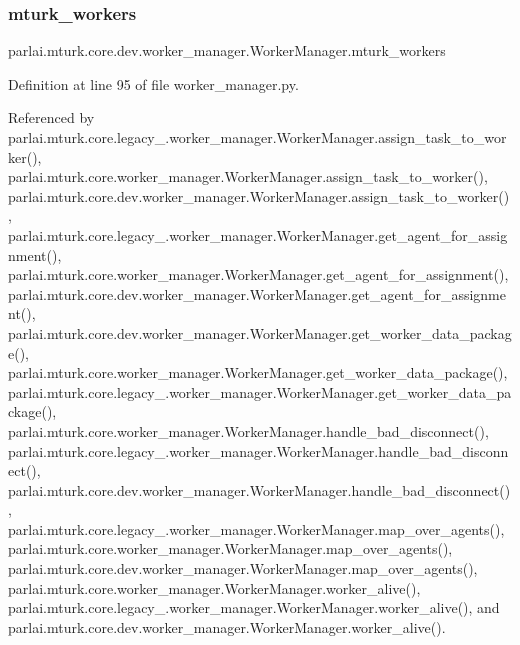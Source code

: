 \subsubsection{\texorpdfstring{mturk\+\_\+workers}{mturk\_workers}}
{\footnotesize\ttfamily parlai.\+mturk.\+core.\+dev.\+worker\+\_\+manager.\+Worker\+Manager.\+mturk\+\_\+workers}



Definition at line 95 of file worker\+\_\+manager.\+py.



Referenced by parlai.\+mturk.\+core.\+legacy\+\_.\+worker\+\_\+manager.\+Worker\+Manager.\+assign\+\_\+task\+\_\+to\+\_\+worker(), parlai.\+mturk.\+core.\+worker\+\_\+manager.\+Worker\+Manager.\+assign\+\_\+task\+\_\+to\+\_\+worker(), parlai.\+mturk.\+core.\+dev.\+worker\+\_\+manager.\+Worker\+Manager.\+assign\+\_\+task\+\_\+to\+\_\+worker(), parlai.\+mturk.\+core.\+legacy\+\_.\+worker\+\_\+manager.\+Worker\+Manager.\+get\+\_\+agent\+\_\+for\+\_\+assignment(), parlai.\+mturk.\+core.\+worker\+\_\+manager.\+Worker\+Manager.\+get\+\_\+agent\+\_\+for\+\_\+assignment(), parlai.\+mturk.\+core.\+dev.\+worker\+\_\+manager.\+Worker\+Manager.\+get\+\_\+agent\+\_\+for\+\_\+assignment(), parlai.\+mturk.\+core.\+dev.\+worker\+\_\+manager.\+Worker\+Manager.\+get\+\_\+worker\+\_\+data\+\_\+package(), parlai.\+mturk.\+core.\+worker\+\_\+manager.\+Worker\+Manager.\+get\+\_\+worker\+\_\+data\+\_\+package(), parlai.\+mturk.\+core.\+legacy\+\_.\+worker\+\_\+manager.\+Worker\+Manager.\+get\+\_\+worker\+\_\+data\+\_\+package(), parlai.\+mturk.\+core.\+worker\+\_\+manager.\+Worker\+Manager.\+handle\+\_\+bad\+\_\+disconnect(), parlai.\+mturk.\+core.\+legacy\+\_.\+worker\+\_\+manager.\+Worker\+Manager.\+handle\+\_\+bad\+\_\+disconnect(), parlai.\+mturk.\+core.\+dev.\+worker\+\_\+manager.\+Worker\+Manager.\+handle\+\_\+bad\+\_\+disconnect(), parlai.\+mturk.\+core.\+legacy\+\_.\+worker\+\_\+manager.\+Worker\+Manager.\+map\+\_\+over\+\_\+agents(), parlai.\+mturk.\+core.\+worker\+\_\+manager.\+Worker\+Manager.\+map\+\_\+over\+\_\+agents(), parlai.\+mturk.\+core.\+dev.\+worker\+\_\+manager.\+Worker\+Manager.\+map\+\_\+over\+\_\+agents(), parlai.\+mturk.\+core.\+worker\+\_\+manager.\+Worker\+Manager.\+worker\+\_\+alive(), parlai.\+mturk.\+core.\+legacy\+\_.\+worker\+\_\+manager.\+Worker\+Manager.\+worker\+\_\+alive(), and parlai.\+mturk.\+core.\+dev.\+worker\+\_\+manager.\+Worker\+Manager.\+worker\+\_\+alive().

\mbox{\label{classparlai_1_1mturk_1_1core_1_1dev_1_1worker__manager_1_1WorkerManager_adb7992844dfa581014469721c7b6ebd8}} 

